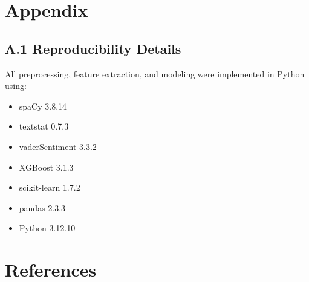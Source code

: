\documentclass[12pt]{article}
\begin{document}
\section*{Appendix}

\subsection*{A.1 Reproducibility Details}

All preprocessing, feature extraction, and modeling were implemented in Python using:

\begin{itemize}
\item spaCy 3.8.14
\item textstat 0.7.3
\item vaderSentiment 3.3.2
\item XGBoost 3.1.3
\item scikit-learn 1.7.2
\item pandas 2.3.3
\item Python 3.12.10
\end{itemize}

\section*{References}
\end{document}
